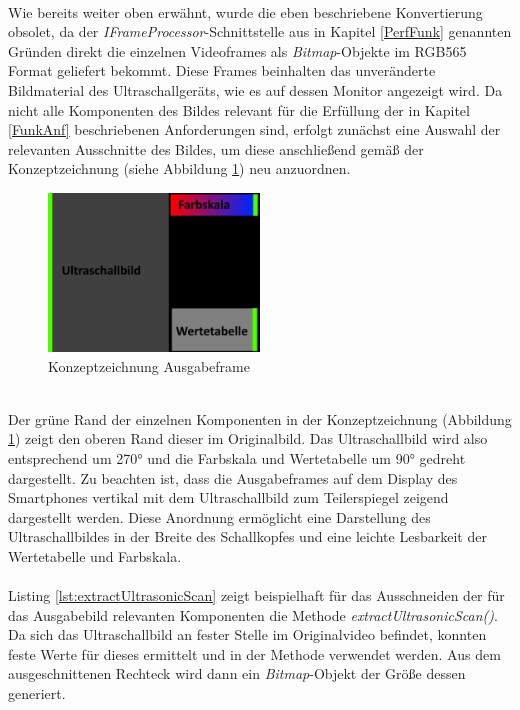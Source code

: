 ~\\
Wie bereits weiter oben erwähnt, wurde die eben beschriebene Konvertierung obsolet, da der \textit{IFrameProcessor}-Schnittstelle aus in Kapitel \ref{PerfFunk} genannten Gründen direkt die einzelnen Videoframes als \textit{Bitmap}-Objekte im RGB565 Format geliefert bekommt. Diese Frames beinhalten das unveränderte Bildmaterial des Ultraschallgeräts, wie es auf dessen Monitor angezeigt wird. Da nicht alle Komponenten des Bildes relevant für die Erfüllung der in Kapitel \ref{FunkAnf} beschriebenen Anforderungen sind, erfolgt zunächst eine Auswahl der relevanten Ausschnitte des Bildes, um diese anschließend gemäß der Konzeptzeichnung (siehe Abbildung \ref{fig:Ausgabeframe}) neu anzuordnen. 

\begin{figure}[h]
	\centering
	\includegraphics[width=0.5\textwidth]{Bilder/Bildverarbeitung/Konzept_Endframe.PNG}
	\caption{Konzeptzeichnung Ausgabeframe}
	\label{fig:Ausgabeframe}
\end{figure}

~\\
Der grüne Rand der einzelnen Komponenten in der Konzeptzeichnung (Abbildung \ref{fig:Ausgabeframe}) zeigt den oberen Rand dieser im Originalbild. Das Ultraschallbild wird also entsprechend um 270° und die Farbskala und Wertetabelle um 90° gedreht dargestellt. Zu beachten ist, dass die Ausgabeframes auf dem Display des Smartphones vertikal mit dem Ultraschallbild zum Teilerspiegel zeigend dargestellt werden. Diese Anordnung ermöglicht eine Darstellung des Ultraschallbildes in der Breite des Schallkopfes und eine leichte Lesbarkeit der Wertetabelle und Farbskala.
\\
\\
Listing \ref{lst:extractUltrasonicScan} zeigt beispielhaft für das Ausschneiden der für das Ausgabebild relevanten Komponenten die Methode \textit{extractUltrasonicScan()}. Da sich das Ultraschallbild an fester Stelle im Originalvideo befindet, konnten feste Werte für dieses ermittelt und in der Methode verwendet werden. Aus dem ausgeschnittenen Rechteck wird dann ein \textit{Bitmap}-Objekt der Größe dessen generiert.

